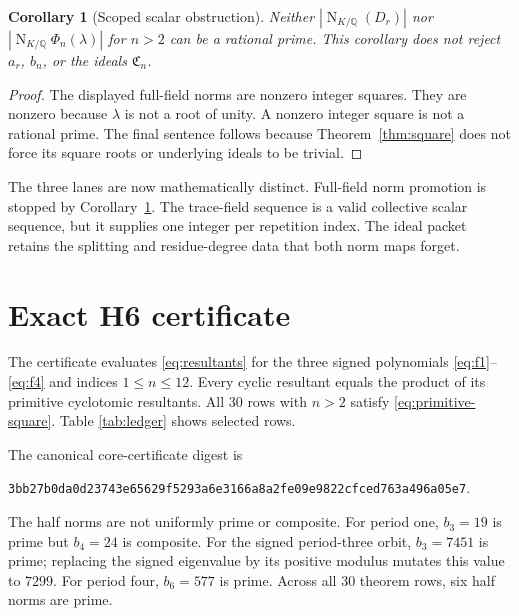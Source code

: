 \documentclass[11pt]{article}
\newtheorem{corollary}[theorem]{Corollary}
\theoremstyle{definition}\newtheorem{definition}[theorem]{Definition}
\theoremstyle{remark}\newtheorem{remark}[theorem]{Remark}
\DeclareMathOperator{\FieldNorm}{N}
\begin{document}
\begin{corollary}[Scoped scalar obstruction]\label{cor:obstruction}
Neither $|\FieldNorm_{K/\mathbb Q}(D_r)|$ nor
$|\FieldNorm_{K/\mathbb Q}\Phi_n(\lambda)|$ for $n>2$ can be a rational prime.
This corollary does not reject $a_r$, $b_n$, or the ideals
$\mathfrak C_n$.
\end{corollary}
\begin{proof}
The displayed full-field norms are nonzero integer squares.  They are nonzero
because $\lambda$ is not a root of unity.  A nonzero integer square is not a
rational prime.  The final sentence follows because Theorem~\ref{thm:square}
does not force its square roots or underlying ideals to be trivial.
\end{proof}

The three lanes are now mathematically distinct.  Full-field norm promotion
is stopped by Corollary~\ref{cor:obstruction}.  The trace-field sequence is a
valid collective scalar sequence, but it supplies one integer per repetition
index.  The ideal packet retains the splitting and residue-degree data that
both norm maps forget.

\section{Exact H6 certificate}

The certificate evaluates \eqref{eq:resultants} for the three signed
polynomials \eqref{eq:f1}--\eqref{eq:f4} and indices $1\le n\le12$.  Every
cyclic resultant equals the product of its primitive cyclotomic resultants.
All 30 rows with $n>2$ satisfy \eqref{eq:primitive-square}.  Table
\ref{tab:ledger} shows selected rows.

The canonical core-certificate digest is
\begin{center}
\small\texttt{3bb27b0da0d23743e65629f5293a6e3166a8a2fe09e9822cfced763a496a05e7}.
\end{center}

\begin{table}[t]
\centering
\caption{Selected exact primitive norms.  The $n=2$ rows are sharp controls:
$\varphi(2)$ is odd, so Theorem~\ref{thm:square} does not assert a half norm.
For $n>2$, the full primitive norm is the square of the displayed integer.}
\label{tab:ledger}
\small
\resizebox{\textwidth}{!}{}
\end{table}

The half norms are not uniformly prime or composite.  For period one,
$b_3=19$ is prime but $b_4=24$ is composite.  For the signed period-three
orbit, $b_3=7451$ is prime; replacing the signed eigenvalue by its positive
modulus mutates this value to $7299$.  For period four, $b_6=577$ is prime.
Across all 30 theorem rows, six half norms are prime.
\end{document}
